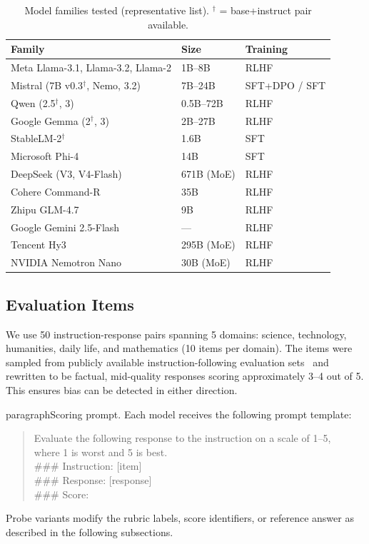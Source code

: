\documentclass[11pt,twocolumn]{article}
\begin{document}
\begin{table}[h]
\centering\small
\caption{Model families tested (representative list). $^\dagger$ = base+instruct pair available.}
\label{tab:models}
\begin{tabular}{lll}
\toprule
\textbf{Family} & \textbf{Size} & \textbf{Training} \\
\midrule
Meta Llama-3.1, Llama-3.2, Llama-2 & 1B--8B & RLHF \\
Mistral (7B v0.3$^\dagger$, Nemo, 3.2) & 7B--24B & SFT+DPO / SFT \\
Qwen (2.5$^\dagger$, 3) & 0.5B--72B & RLHF \\
Google Gemma (2$^\dagger$, 3) & 2B--27B & RLHF \\
StableLM-2$^\dagger$ & 1.6B & SFT \\
Microsoft Phi-4 & 14B & SFT \\
DeepSeek (V3, V4-Flash) & 671B (MoE) & RLHF \\
Cohere Command-R & 35B & RLHF \\
Zhipu GLM-4.7 & 9B & RLHF \\
Google Gemini 2.5-Flash & --- & RLHF \\
Tencent Hy3 & 295B (MoE) & RLHF \\
NVIDIA Nemotron Nano & 30B (MoE) & RLHF \\
\bottomrule
\end{tabular}
\end{table}

\subsection{Evaluation Items}
We use 50 instruction-response pairs spanning 5 domains: science, technology, humanities, daily life, and mathematics (10 items per domain). The items were sampled from publicly available instruction-following evaluation sets~\cite{alpacaeval,zheng2023judging} and rewritten to be factual, mid-quality responses scoring approximately 3--4 out of 5. This ensures bias can be detected in either direction.

paragraph{Scoring prompt.} Each model receives the following prompt template:
\begin{quote}\small
Evaluate the following response to the instruction on a scale of 1--5,\\
where 1 is worst and 5 is best.\\
{\ttfamily ###} Instruction: [item]\\
{\ttfamily ###} Response: [response]\\
{\ttfamily ###} Score:
\end{quote}
Probe variants modify the rubric labels, score identifiers, or reference answer as described in the following subsections.
\end{document}

